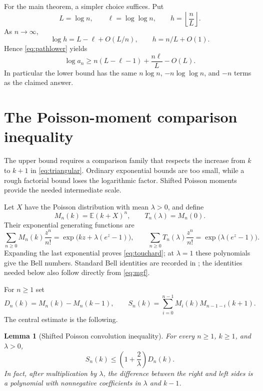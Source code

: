 \documentclass[11pt]{article}
\numberwithin{equation}{section}
\newtheorem{lemma}[theorem]{Lemma}
\theoremstyle{definition}
\theoremstyle{remark}
\newcommand{\E}{\mathbb E}
\begin{document}
For the main theorem, a simpler choice suffices. Put
\[
 L=\log n,\qquad \ell=\log\log n,
 \qquad h=\left\lfloor\frac nL\right\rfloor.
\]
As $n\to\infty$,
\[
 \log h=L-\ell+O(L/n),\qquad h=n/L+O(1).
\]
Hence \eqref{eq:pathlower} yields
\begin{equation}\label{eq:lowerexpanded}
 \log a_n\ge n(L-\ell-1)+\frac{n\ell}{L}-O(L).
\end{equation}
In particular the lower bound has the same $n\log n$, $-n\log\log n$,
and $-n$ terms as the claimed answer.

\section{The Poisson-moment comparison inequality}\label{sec:poisson}

The upper bound requires a comparison family that respects the increase
from $k$ to $k+1$ in \eqref{eq:triangular}. Ordinary exponential bounds
are too small, while a rough factorial bound loses the logarithmic
factor. Shifted Poisson moments provide the needed intermediate scale.

Let $X$ have the Poisson distribution with mean $\lambda>0$, and define
\begin{equation}\label{eq:M}
 M_n(k)=\E(k+X)^n,\qquad T_n(\lambda)=M_n(0).
\end{equation}
Their exponential generating functions are
\begin{equation}\label{eq:mgf}
 \sum_{n\ge0}M_n(k)\frac{z^n}{n!}
 =\exp\!\bigl(kz+\lambda(e^z-1)\bigr),
 \qquad
 \sum_{n\ge0}T_n(\lambda)\frac{z^n}{n!}
 =\exp\!\bigl(\lambda(e^z-1)\bigr).
\end{equation}
Expanding the last exponential proves \eqref{eq:touchard}; at
$\lambda=1$ these polynomials give the Bell numbers. Standard Bell
identities are recorded in \cite{dlmf-bell}; the identities needed below
also follow directly from \eqref{eq:mgf}.

For $n\ge1$ set
\begin{equation}\label{eq:DS}
 D_n(k)=M_n(k)-M_n(k-1),\qquad
 S_n(k)=\sum_{i=0}^{n-1}M_i(k)M_{n-1-i}(k+1).
\end{equation}
The central estimate is the following.

\begin{lemma}[Shifted Poisson convolution inequality]\label{lem:poisson}
For every $n\ge1$, $k\ge1$, and $\lambda>0$,
\begin{equation}\label{eq:poissonineq}
 S_n(k)\le\left(1+\frac2\lambda\right)D_n(k).
\end{equation}
In fact, after multiplication by $\lambda$, the difference between the
right and left sides is a polynomial with nonnegative coefficients in
$\lambda$ and $k-1$.
\end{lemma}
\end{document}
